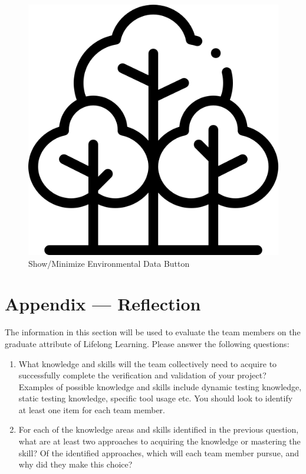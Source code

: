 \documentclass[12pt, titlepage]{article}
\begin{document}
\begin{figure}[H]
    \centering
    \includegraphics[scale = 0.5]{VnV_Pictures/environmental_data.png}
    \caption{Show/Minimize Environmental Data Button}
\end{figure}

\newpage


\newpage{}
\section*{Appendix --- Reflection}

The information in this section will be used to evaluate the team members on the
graduate attribute of Lifelong Learning.  Please answer the following questions:

\begin{enumerate}
  \item What knowledge and skills will the team collectively need to acquire to
  successfully complete the verification and validation of your project?
  Examples of possible knowledge and skills include dynamic testing knowledge,
  static testing knowledge, specific tool usage etc.  You should look to
  identify at least one item for each team member.
  \item For each of the knowledge areas and skills identified in the previous
  question, what are at least two approaches to acquiring the knowledge or
  mastering the skill?  Of the identified approaches, which will each team
  member pursue, and why did they make this choice?
\end{enumerate}
\end{document}
